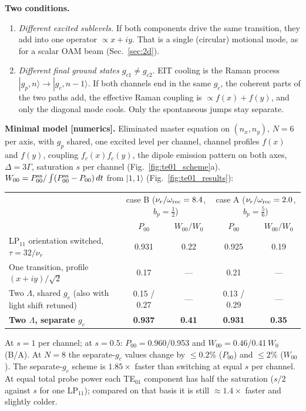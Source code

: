 \documentclass[11pt,a4paper]{article}
\newcommand{\ket}[1]{|#1\rangle}
\begin{document}
\textbf{Two conditions.}
\begin{enumerate}
\item \emph{Different excited sublevels.} If both components drive the same transition, they add into one operator $\propto x+iy$. That is a single (circular) motional mode, as for a scalar OAM beam (Sec.~\ref{sec:2d}).
\item \emph{Different final ground states} $g_{c1}\neq g_{c2}$. EIT cooling is the Raman process $\ket{g_p,n}\to\ket{g_c,n-1}$. If both channels end in the same $g_c$, the coherent parts of the two paths add, the effective Raman coupling is $\propto f(x)+f(y)$, and only the diagonal mode cools. Only the spontaneous jumps stay separate.
\end{enumerate}

\textbf{Minimal model [numerics].} Eliminated master equation on $(n_x,n_y)$, $N=6$ per axis, with $g_p$ shared, one excited level per channel, channel profiles $f(x)$ and $f(y)$, coupling $f_c(x)f_c(y)$, the dipole emission pattern on both axes, $\Delta=3\Gamma$, saturation $s$ per channel (Fig.~\ref{fig:te01_scheme}a). $W_{00}=P_{00}^{\rm ss}/\int(P_{00}^{\rm ss}-P_{00})\,dt$ from $\ket{1,1}$ (Fig.~\ref{fig:te01_results}):

\begin{center}\small
\begin{tabular}{lcccc}
\toprule
 & \multicolumn{2}{c}{case B ($\nu_r/\omega_{\rm rec}=8.4$, $b_p=\frac12$)} & \multicolumn{2}{c}{case A ($\nu_r/\omega_{\rm rec}=2.0$, $b_p=\frac56$)}\\
 & $P_{00}$ & $W_{00}/W_0$ & $P_{00}$ & $W_{00}/W_0$\\
\midrule
LP$_{11}$ orientation switched, $\tau=32/\nu_r$ & 0.931 & 0.22 & 0.925 & 0.19\\
One transition, profile $(x+iy)/\sqrt2$ & 0.17 & --- & 0.21 & ---\\
Two $\Lambda$, shared $g_c$ (also with light shift retuned) & 0.15 / 0.27 & --- & 0.13 / 0.29 & ---\\
\textbf{Two $\Lambda$, separate $g_c$} & \textbf{0.937} & \textbf{0.41} & \textbf{0.931} & \textbf{0.35}\\
\bottomrule
\end{tabular}
\end{center}
At $s=1$ per channel; at $s=0.5$: $P_{00}=0.960$/0.953 and $W_{00}=0.46$/0.41\,$W_0$ (B/A). At $N=8$ the separate-$g_c$ values change by $\le0.2\%$ ($P_{00}$) and $\le2\%$ ($W_{00}$). The separate-$g_c$ scheme is $1.85\times$ faster than switching at equal $s$ per channel. At equal total probe power each TE$_{01}$ component has half the saturation ($s/2$ against $s$ for one LP$_{11}$); compared on that basis it is still $\approx1.4\times$ faster and slightly colder.
\end{document}
